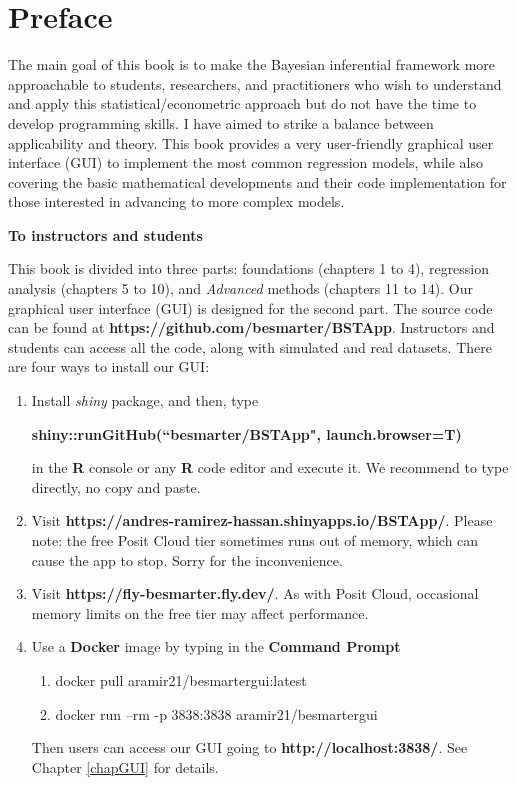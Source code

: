\chapter*{Preface}
The main goal of this book is to make the Bayesian inferential framework more approachable to students, researchers, and practitioners who wish to understand and apply this statistical/econometric approach but do not have the time to develop programming skills. I have aimed to strike a balance between applicability and theory. This book provides a very user-friendly graphical user interface (GUI) to implement the most common regression models, while also covering the basic mathematical developments and their code implementation for those interested in advancing to more complex models.

\textbf{To instructors and students}

This book is divided into three parts: foundations (chapters 1 to 4), regression analysis (chapters 5 to 10), and \textit{Advanced} methods (chapters 11 to 14). Our graphical user interface (GUI) is designed for the second part. The source code can be found at \textbf{https://github.com/besmarter/BSTApp}. Instructors and students can access all the code, along with simulated and real datasets. There are four ways to install our GUI:

\begin{enumerate}
	\item Install \textit{shiny} package, and then, type
	
	\textbf{shiny::runGitHub(``besmarter/BSTApp", launch.browser=T)} 
	
	in the \textbf{R} console or any \textbf{R} code editor and execute it. We recommend to type directly, no copy and paste.
	\item Visit \textbf{https://andres-ramirez-hassan.shinyapps.io/BSTApp/}. Please note: the free Posit Cloud tier sometimes runs out of memory, which can cause the app to stop. Sorry for the inconvenience.
	\item Visit \textbf{https://fly-besmarter.fly.dev/}. As with Posit Cloud, occasional memory limits on the free tier may affect performance.
	\item Use a \textbf{Docker} image by typing in the \textbf{Command Prompt}
	\begin{enumerate}
		\item docker pull aramir21/besmartergui:latest
		\item docker run --rm -p 3838:3838 aramir21/besmartergui
	\end{enumerate}
	Then users can access our GUI going to \textbf{http://localhost:3838/}. See Chapter \ref{chapGUI} for details.
\end{enumerate}

